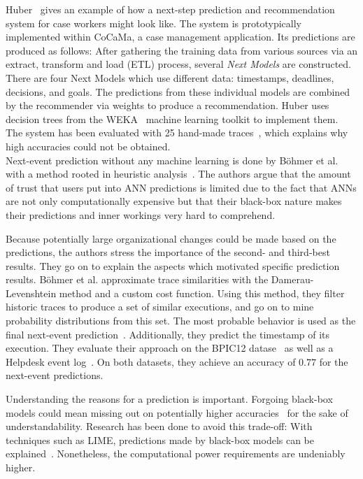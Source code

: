 Huber~\cite{huber2015} gives an example of how a next-step prediction and recommendation system for case workers might look like. The system is prototypically implemented within CoCaMa, a case management application. Its predictions are produced as follows: After gathering the training data from various sources via an extract, transform and load (ETL) process, several \textit{Next Models} are constructed. There are four Next Models which use different data: timestamps, deadlines, decisions, and goals. The predictions from these individual models are combined by the recommender via weights to produce a recommendation. Huber uses decision trees from the WEKA~\cite{web:weka} machine learning toolkit to implement them. The system has been evaluated with 25 hand-made traces~\cite{huber2015}, which explains why high accuracies could not be obtained.\\

Next-event prediction without any machine learning is done by Böhmer et al. with a method rooted in heuristic analysis~\cite{boehmer2018probability}. The authors argue that the amount of trust that users put into ANN predictions is limited due to the fact that ANNs are not only computationally expensive but that their black-box nature makes their predictions and inner workings very hard to comprehend.

Because potentially large organizational changes could be made based on the predictions, the authors stress the importance of the second- and third-best results. They go on to explain the aspects which motivated specific prediction results.
Böhmer et al. approximate trace similarities with the Damerau-Levenshtein method and a custom cost function. Using this method, they filter historic traces to produce a set of similar executions, and go on to mine probability distributions from this set. The most probable behavior is used as the final next-event prediction~\cite{boehmer2018probability}. Additionally, they predict the timestamp of its execution. They evaluate their approach on the BPIC12 datase~\cite{BPIC2012} as well as a Helpdesk event log~\cite{Helpdesk}. On both datasets, they achieve an accuracy of $0.77$ for the next-event predictions.

Understanding the reasons for a prediction is important. Forgoing black-box models could mean missing out on potentially higher accuracies~\cite{tax2018interdisciplinary} for the sake of understandability. Research has been done to avoid this trade-off: With techniques such as LIME, predictions made by black-box models can be explained~\cite{ribeiro2016should}. Nonetheless, the computational power requirements are undeniably higher.\\

